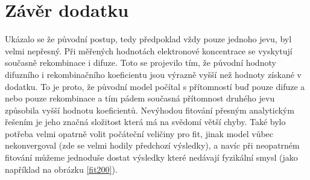 \documentclass[12pt]{article}
\begin{document}
\section{Závěr dodatku}
Ukázalo se že původní postup, tedy předpoklad vždy pouze jednoho jevu, byl velmi nepřesný. Při měřených hodnotách elektronové koncentrace se vyskytují současně rekombinace i difuze. Toto se projevilo tím, že původní hodnoty difuzního i rekombinačního koeficientu jsou výrazně vyšší než hodnoty získané v dodatku. To je proto, že původní model počítal s přítomností buď pouze difuze a nebo pouze rekombinace a tím pádem současná přítomnost druhého jevu způsobila vyšší hodnotu koeficientů. Nevýhodou fitování přesným analytickým řešením je jeho značná složitost která má na svědomí větší chyby. Také bylo potřeba velmi opatrně volit počáteční veličiny pro fit, jinak model vůbec nekonvergoval (zde se velmi hodily předchozí výsledky), a navíc při neopatrném fitování můžeme jednoduše dostat výsledky které nedávají fyzikální smysl (jako například na obrázku \ref{fit200}). 
\end{document}
